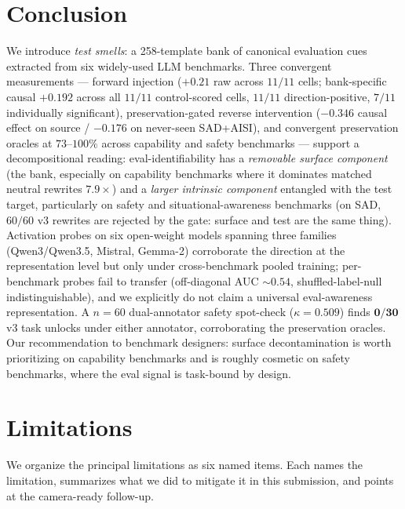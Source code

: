 \documentclass[11pt]{article}
\newcommand{\bench}[1]{\textsc{#1}}
\begin{document}
\section{Conclusion}
\label{sec:conclusion}

We introduce \emph{test smells}: a 258-template bank of canonical evaluation cues
extracted from six widely-used LLM benchmarks. Three convergent measurements ---
forward injection ($+0.21$ raw across $11/11$ cells; bank-specific causal
$+0.192$ across all $11/11$ control-scored cells, $11/11$ direction-positive,
$7/11$ individually significant),
preservation-gated reverse intervention ($-0.346$ causal effect on source
/ $-0.176$ on never-seen \bench{SAD}+\bench{AISI}), and convergent
preservation oracles at $73$--$100\%$ across capability and safety benchmarks
--- support a decompositional reading: eval-identifiability has a
\emph{removable surface component} (the bank, especially on capability benchmarks
where it dominates matched neutral rewrites $7.9\times$) and a \emph{larger
intrinsic component} entangled with the test target, particularly on safety
and situational-awareness benchmarks (on \bench{SAD}, $60/60$ v3 rewrites are
rejected by the gate: surface and test are the same thing). Activation probes on six open-weight models spanning three families (Qwen3/Qwen3.5, Mistral, Gemma-2) corroborate the
direction at the representation level but only under cross-benchmark pooled
training; per-benchmark probes fail to transfer (off-diagonal AUC $\sim 0.54$,
shuffled-label-null indistinguishable),
and we explicitly do not claim a universal eval-awareness representation. A
$n{=}60$ dual-annotator safety spot-check ($\kappa{=}0.509$) finds $\bm{0/30}$
v3 task unlocks under either annotator, corroborating the preservation oracles. Our
recommendation to benchmark designers: surface decontamination is worth
prioritizing on capability benchmarks and is roughly cosmetic on safety
benchmarks, where the eval signal is task-bound by design.

\section{Limitations}
\label{sec:limitations}

We organize the principal limitations as six named items. Each names
the limitation, summarizes what we did to mitigate it in this submission,
and points at the camera-ready follow-up.
\end{document}
